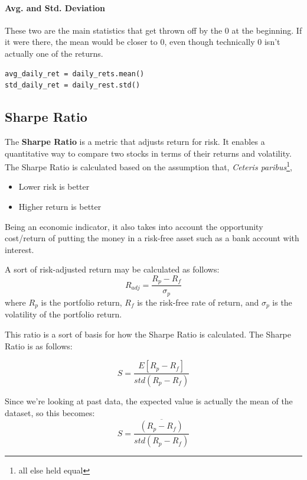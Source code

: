 \paragraph{Avg. and Std. Deviation} These two are the main statistics that get thrown off by the 0 at the beginning. If it were there, the mean would be closer to 0, even though technically 0 isn't actually one of the returns.

\begin{lstlisting}[style=python]
avg_daily_ret = daily_rets.mean()
std_daily_ret = daily_rest.std()
\end{lstlisting}

\subsection{Sharpe Ratio}
\noindent The \textbf{Sharpe Ratio} is a metric that adjusts return for risk. It enables a quantitative way to compare two stocks in terms of their returns and volatility. The Sharpe Ratio is calculated based on the assumption that, \textit{Ceteris paribus}\footnote{all else held equal},
\begin{itemize}
	\item Lower risk is better
    \item Higher return is better
\end{itemize}
Being an economic indicator, it also takes into account the opportunity cost/return of putting the money in a risk-free asset such as a bank account with interest.

\noindent A sort of risk-adjusted return may be calculated as follows:
\begin{equation*}
	R_{adj} = \frac{R_p - R_f}{\sigma_p}
\end{equation*}
where $R_p$ is the portfolio return, $R_f$ is the risk-free rate of return, and $\sigma_p$ is the volatility of the portfolio return.

\noindent This ratio is a sort of basis for how the Sharpe Ratio is calculated. The Sharpe Ratio is as follows:

\begin{equation*}
	S = \frac{E[R_p - R_f]}{std(R_p-R_f)}
\end{equation*}

\noindent Since we're looking at past data, the expected value is actually the mean of the dataset, so this becomes:\\

\begin{equation*}
	S = \frac{\overline{(R_p - R_f)}}{std(R_p-R_f)}
\end{equation*}

